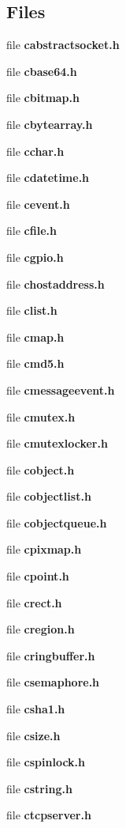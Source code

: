 \subsection*{Files}
\begin{DoxyCompactItemize}
\item 
file {\bf cabstractsocket.\-h}
\item 
file {\bf cbase64.\-h}
\begin{DoxyCompactList}\small\item\em 

 \end{DoxyCompactList}\item 
file {\bf cbitmap.\-h}
\item 
file {\bf cbytearray.\-h}
\item 
file {\bf cchar.\-h}
\item 
file {\bf cdatetime.\-h}
\item 
file {\bf cevent.\-h}
\item 
file {\bf cfile.\-h}
\item 
file {\bf cgpio.\-h}
\item 
file {\bf chostaddress.\-h}
\item 
file {\bf clist.\-h}
\item 
file {\bf cmap.\-h}
\item 
file {\bf cmd5.\-h}
\item 
file {\bf cmessageevent.\-h}
\item 
file {\bf cmutex.\-h}
\item 
file {\bf cmutexlocker.\-h}
\item 
file {\bf cobject.\-h}
\item 
file {\bf cobjectlist.\-h}
\item 
file {\bf cobjectqueue.\-h}
\item 
file {\bf cpixmap.\-h}
\item 
file {\bf cpoint.\-h}
\item 
file {\bf crect.\-h}
\item 
file {\bf cregion.\-h}
\item 
file {\bf cringbuffer.\-h}
\item 
file {\bf csemaphore.\-h}
\item 
file {\bf csha1.\-h}
\begin{DoxyCompactList}\small\item\em 

 \end{DoxyCompactList}\item 
file {\bf csize.\-h}
\item 
file {\bf cspinlock.\-h}
\item 
file {\bf cstring.\-h}
\item 
file {\bf ctcpserver.\-h}
\begin{DoxyCompactList}\small\item\em 


\end{DoxyCompactList}
\end{DoxyCompactItemize}
